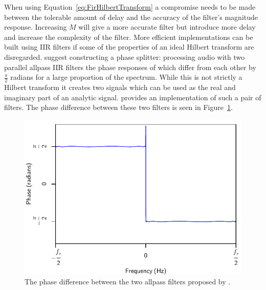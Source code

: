 			When using Equation~\ref{eq:FirHilbertTransform} a compromise needs to be made between the
			tolerable amount of delay and the accuracy of the filter's magnitude response. Increasing $M$ will
			give a more accurate filter but introduce more delay and increase the complexity of the filter.
			More efficient implementations can be built using IIR filters if some of the properties of an ideal
			Hilbert transform are disregarded.  \citet{oppenheim2014discrete} suggest constructing a phase
			splitter: processing audio with two parallel allpass IIR filters the phase responses of which
			differ from each other by $\frac{\pi}{2}$ radians for a large proportion of the spectrum. While
			this is not strictly a Hilbert transform it creates two signals which can be used as the real and
			imaginary part of an analytic signal. \citet{niemitalo2003hilbert} provides an implementation of
			such a pair of filters. The phase difference between these two filters is seen in
			Figure~\ref{fig:IIRHilbertPhase}.

			\begin{figure}[h!]
				\centering
				\includegraphics{chapter2/Images/IIRHilbertPhaseResponses.pdf}
				\caption{The phase difference between the two allpass filters proposed by
					 \citet{niemitalo2003hilbert}.}
				\label{fig:IIRHilbertPhase}
			\end{figure}

